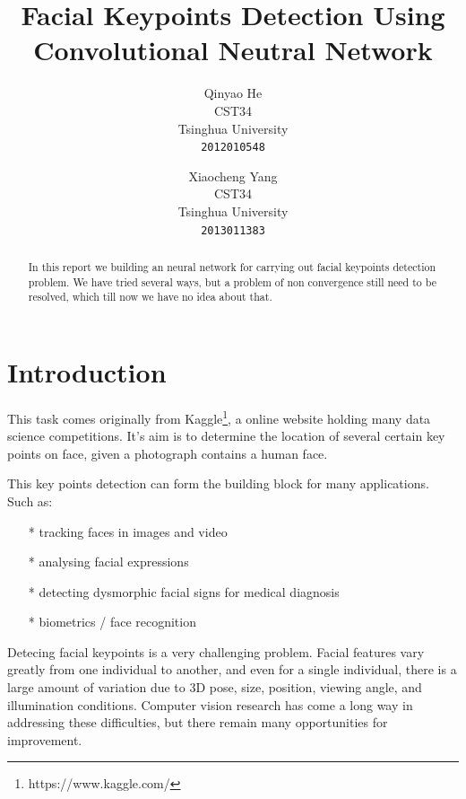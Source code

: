 \documentclass[10pt,twocolumn,letterpaper]{article}
\begin{document}
\title{Facial Keypoints Detection Using Convolutional Neutral Network}

\author{Qinyao He\\
CST34\\
Tsinghua University\\
{\tt\small 2012010548}
\and
Xiaocheng Yang\\
CST34\\
Tsinghua University\\
{\tt\small 2013011383}
}

\maketitle

\begin{abstract}
   In this report we building an neural network for carrying out facial
   keypoints detection problem. We have tried several ways, but a problem
   of non convergence still need to be resolved, which till now we have no
   idea about that.
\end{abstract}

\section{Introduction}

This task comes originally from Kaggle\footnote{https://www.kaggle.com/},
a online website holding many data science competitions. It's aim is to
determine the location of several certain key points on face, given a photograph
contains a human face.

This key points detection can form the building block for many applications. Such as:
	\begin{itemize}
		\item[*] tracking faces in images and video
		\item[*] analysing facial expressions
		\item[*] detecting dysmorphic facial signs for medical diagnosis
		\item[*] biometrics / face recognition
	\end{itemize}
Detecing facial keypoints is a very challenging problem. 
Facial features vary greatly from one individual to another,
and even for a single individual, there is a large amount of variation
due to 3D pose, size, position, viewing angle, and illumination conditions.
Computer vision research has come a long way in addressing these difficulties,
but there remain many opportunities for improvement.
\end{document}
